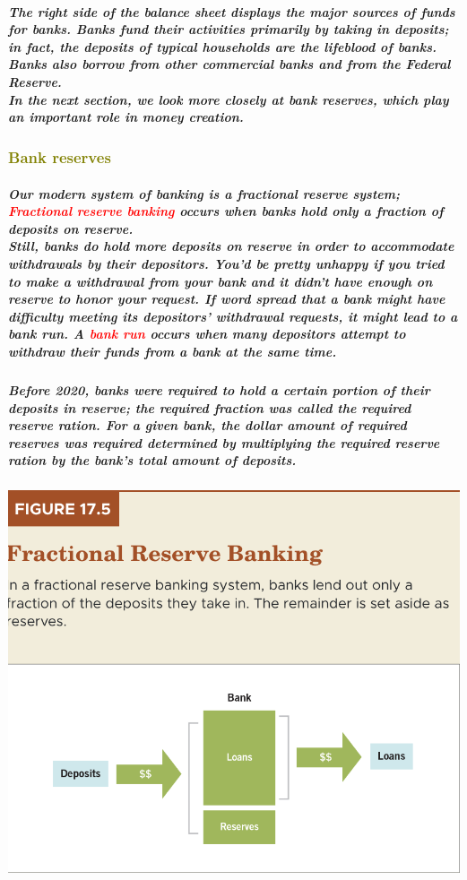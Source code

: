 \documentclass[11pt]{article} %
\begin{document}
\subparagraph*{The right side of the balance sheet displays the major sources of funds for banks. Banks fund their activities primarily by taking in deposits; in fact, the deposits of typical households are the lifeblood of banks. Banks also borrow from other commercial banks and from the Federal Reserve. \\In the next section, we look more closely at bank reserves, which play an important role in money creation.}

\subsubsection*{\textbf{\textcolor{olive}{Bank reserves}}}
\subparagraph*{Our modern system of banking is a fractional reserve system; \textbf{\textcolor{red}{Fractional reserve banking}} occurs when banks hold only a fraction of deposits on reserve.\\Still, banks do hold more deposits on reserve in order to accommodate withdrawals by their depositors. You'd be pretty unhappy if you tried to make a withdrawal from your bank and it didn't have enough on reserve to honor your request. If word spread that a bank might have difficulty meeting its depositors' withdrawal requests, it might lead to a bank run. A \textbf{\textcolor{red}{bank run}} occurs when many depositors attempt to withdraw their funds from a bank at the same time.}
\subparagraph*{Before 2020, banks were required to hold a certain portion of their deposits in reserve; the required fraction was called the required reserve ration. \textit{For a given bank, the dollar amount of required reserves was required determined by multiplying the required reserve ration by the bank's total amount of deposits.}}

\begin{center}
\includegraphics[scale=0.5]{images/Figure 17.5.png} 
\end{center}
\end{document}
